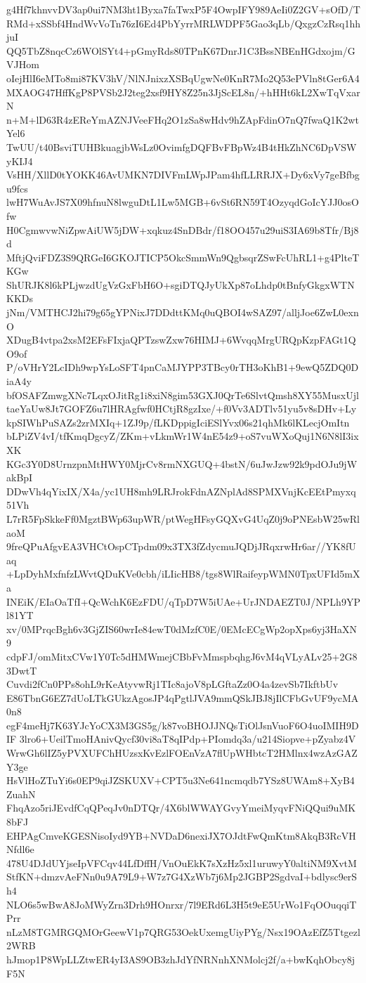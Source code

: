 g4Hf7khnvvDV3ap0ui7NM3ht1Byxa7faTwxP5F4OwpIFY989AeIi0Z2GV+sOfD/T
RMd+xSSbf4HndWvVoTn76zI6Ed4PbYyrrMRLWDPF5Gao3qLb/QxgzCzRsq1hhjuI
QQ5TbZ8nqcCz6WOlSYt4+pGmyRds80TPnK67DnrJ1C3BssNBEnHGdxojm/GVJHom
oIejHlI6eMTo8mi87KV3hV/NlNJnixzXSBqUgwNe0KnR7Mo2Q53ePVln8tGer6A4
MXAOG47HffKgP8PVSb2J2teg2xsf9HY8Z25n3JjScEL8n/+hHHt6kL2XwTqVxarN
n+M+lD63R4zEReYmAZNJVeeFHq2O1zSa8wHdv9hZApFdinO7nQ7fwaQ1K2wtYel6
TwUU/t40BsviTUHBkuagjbWsLz0OvimfgDQFBvFBpWz4B4tHkZhNC6DpVSWyKIJ4
VsHH/XllD0tYOKK46AvUMKN7DIVFmLWpJPam4hfLLRRJX+Dy6xVy7geBfbgu9fcs
lwH7WuAvJS7X09hfnuN8lwguDtL1Lw5MGB+6vSt6RN59T4OzyqdGoIcYJJ0osOfw
H0CgmwvwNiZpwAiUW5jDW+xqkuz4SnDBdr/f18OO457u29uiS3IA69b8Tfr/Bj8d
MftjQviFDZ3S9QRGeI6GKOJTICP5OkcSmmWn9QgbsqrZSwFcUhRL1+g4PlteTKGw
ShURJK8l6kPLjwzdUgVzGxFbH6O+sgiDTQJyUkXp87oLhdp0tBnfyGkgxWTNKKDs
jNm/VMTHCJ2hi79g65gYPNixJ7DDdttKMq0uQBOI4wSAZ97/alljJoe6ZwL0exnO
XDugB4vtpa2xsM2EFsFIxjaQPTzswZxw76HIMJ+6WvqqMrgURQpKzpFAGt1QO9of
P/oVHrY2LcIDh9wpYsLoSFT4pnCaMJYPP3TBcy0rTH3oKhB1+9ewQ5ZDQ0DiaA4y
bfOSAFZmwgXNc7LqxOJitRg1i8xiN8gim53GXJ0QrTe6SlvtQmsh8XY55MusxUjl
taeYaUw8Jt7GOFZ6u7lHRAgfwf0HCtjR8gzIxe/+f0Vv3ADTlv51yu5v8sDHv+Ly
kpSIWhPuSAZs2zrMXIq+1ZJ9p/fLKDppigIciESlYvx06s21qhMk6lKLecjOmItn
bLPiZV4vI/tfKmqDgcyZ/ZKm+vLkmWr1W4nE54z9+oS7vuWXoQuj1N6N8lI3ixXK
KGc3Y0D8UrnzpnMtHWY0MjrCv8rmNXGUQ+4bstN/6uJwJzw92k9pdOJu9jWakBpI
DDwVh4qYixIX/X4a/yc1UH8mh9LRJrokFdnAZNplAd8SPMXVnjKcEEtPmyxq51Vh
L7rR5FpSkkeFf0MgztBWp63upWR/ptWegHFsyGQXvG4UqZ0j9oPNEsbW25wRlaoM
9freQPuAfgvEA3VHCtOspCTpdm09x3TX3fZdycmuJQDjJRqxrwHr6ar//YK8fUaq
+LpDyhMxfnfzLWvtQDuKVe0cbh/iLIicHB8/tgs8WlRaifeypWMN0TpxUFId5mXa
INEiK/EIaOaTfI+QcWchK6EzFDU/qTpD7W5iUAe+UrJNDAEZT0J/NPLh9YPl81YT
xv/0MPrqcBgh6v3GjZIS60wrIe84ewT0dMzfC0E/0EMcECgWp2opXps6yj3HaXN9
cdpFJ/omMitxCVw1Y0Tc5dHMWmejCBbFvMmspbqhgJ6vM4qVLyALv25+2G83DwtT
Cuvdi2fCn0PPs8ohL9rKeAtyvwRj1TIc8ajoV8pLGftaZz0O4a4zevSb7IkftbUv
E86TbnG6EZ7dUoLTkGUkzAgosJP4qPgtlJVA9mmQSkJBJ8jIlCFbGvUF9ycMA0n8
egF4meHj7K63YJcYoCX3M3GS5g/k87voBHOJJNQsTiOlJsnVuoF6O4uoIMIH9DIF
3lro6+UeilTmoHAnivQycf30vi8aT8qIPdp+PIomdq3a/u214Siopve+pZyabz4V
WrwGh6lIZ5yPVXUFChHUzsxKvEzlFOEnVzA7flUpWHbtcT2HMlnx4wzAzGAZY3ge
HsVlHoZTuYi6s0EP9qiJZSKUXV+CPT5u3Ne641ncmqdb7YSz8UWAm8+XyB4ZuahN
FhqAzo5riJEvdfCqQPeqJv0nDTQr/4X6blWWAYGvyYmeiMyqvFNiQQui9uMK8bFJ
EHPAgCmveKGESNisoIyd9YB+NVDaD6nexiJX7OJdtFwQmKtm8AkqB3RcVHNfdl6e
478U4DJdUYjseIpVFCqv44LfDffH/VnOuEkK7sXzHz5xl1uruwyY0altiNM9XvtM
StfKN+dmzvAeFNn0u9A79L9+W7z7G4XzWb7j6Mp2JGBP2SgdvaI+bdlysc9erSh4
NLO6s5wBwA8JoMWyZrn3Drh9HOnrxr/7l9ERd6L3H5t9eE5UrWo1FqOOuqqiTPrr
nLzM8TGMRGQMOrGeewV1p7QRG53OekUxemgUiyPYg/Nsx19OAzEfZ5Ttgezl2WRB
hJmop1P8WpLLZtwER4yI3AS9OB3zhJdYfNRNnhXNMolcj2f/a+bwKqhObcy8jF5N
